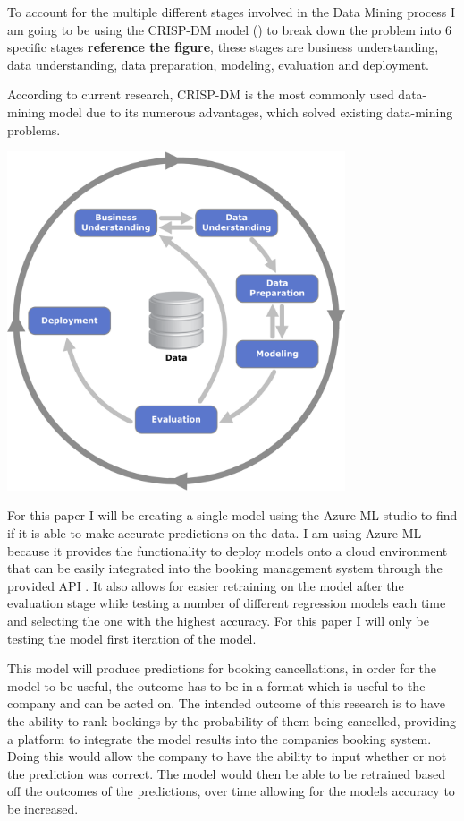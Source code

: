 To account for the multiple different stages involved in the Data Mining process I am going to be using the CRISP-DM model (\cite{WirthCRISP-DM:Mining}) to break down the problem into 6 specific stages \textbf{reference the figure}, these stages are business understanding, data understanding, data preparation, modeling, evaluation and deployment.

According to current research, CRISP-DM is the most commonly used data-mining model due to its numerous advantages, which solved existing data-mining problems. 


\vspace{5mm}


 \includegraphics[width=10cm]{figures/CRISPDM_Process_Diagram.png}
 



For this paper I will be creating a single model using the Azure ML studio to find if it is able to make accurate predictions on the data. I am using Azure ML because it provides the functionality to deploy models onto a cloud environment that can be easily integrated into the booking management system through the provided API . It also allows for easier retraining on the model after the evaluation stage while testing a number of different regression models each time and selecting the one with the highest accuracy. For this paper I will only be testing the model first iteration of the model.

This model will produce predictions for booking cancellations, in order for the model to be useful, the outcome has to be in a format which is useful to the company and can be acted on. The intended outcome of this research is to have the ability to rank bookings by the probability of them being cancelled, providing a platform to integrate the model results into the companies booking system. Doing this would allow the company to have the ability to input whether or not the prediction was correct. The model would then be able to be retrained based off the outcomes of the predictions, over time allowing for the models accuracy to be increased. 

